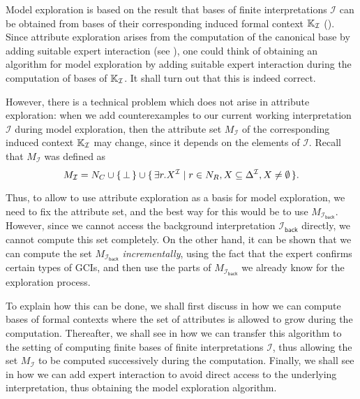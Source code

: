 Model exploration is based on the result that bases of finite interpretations
$\mathcal{I}$ can be obtained from bases of their corresponding induced formal context
${\mathbb{K}}_{\mathcal{I}}$ ().  Since attribute exploration arises
from the computation of the canonical base by adding suitable expert interaction (see
), one could think of obtaining an algorithm for model exploration by
adding suitable expert interaction during the computation of bases of ${\mathbb{K}}_{\mathcal{I}}$.  It shall turn out that this is indeed correct.

However, there is a technical problem which does not arise in attribute exploration: when
we add counterexamples to our current working interpretation $\mathcal{I}$ during model
exploration, then the attribute set $M_{\mathcal{I}}$ of the corresponding induced context
${\mathbb{K}}_{\mathcal{I}}$ may change, since it depends on the elements of $\mathcal{I}$.
Recall that $M_{\mathcal{I}}$ was defined as
\begin{equation*}
  M_{\mathcal{I}} = N_{C} \cup {\ensuremath{\{\, \bot \,\}}} \cup {\ensuremath{\{\, \exists r. X^{\mathcal{I}} \mid r
    \in N_{R}, X \subseteq \Delta^{\mathcal{I}}, X \neq \emptyset \,\}}}.
\end{equation*}

Thus, to allow to use attribute exploration as a basis for model exploration, we need to
fix the attribute set, and the best way for this would be to use
$M_{\mathcal{I}_{\mathsf{back}}}$.  However, since we cannot access the background
interpretation $\mathcal{I}_{\mathsf{back}}$ directly, we cannot compute this set
completely.  On the other hand, it can be shown that we can compute the set
$M_{\mathcal{I}_{\mathsf{back}}}$ \emph{incrementally}, using the fact that the expert
confirms certain types of GCIs, and then use the parts of
$M_{\mathcal{I}_{\mathsf{back}}}$ we already know for the exploration process.

To explain how this can be done, we shall first discuss in  how
we can compute bases of formal contexts where the set of attributes is allowed to grow
during the computation.  Thereafter, we shall see in  how we
can transfer this algorithm to the setting of computing finite bases of finite
interpretations $\mathcal{I}$, thus allowing the set $M_{\mathcal{I}}$ to be computed
successively during the computation.  Finally, we shall see in 
how we can add expert interaction to avoid direct access to the underlying interpretation,
thus obtaining the model exploration algorithm.

